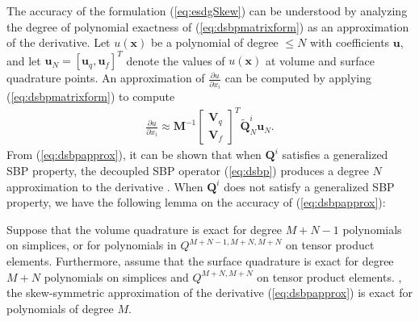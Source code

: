 \documentclass{svjour3}                     %
\renewcommand{\tilde}{\widetilde}
\newcommand{\pd}[2]{\frac{\partial#1}{\partial#2}}
\newcommand{\LRp}[1]{\left( #1 \right)}
\newcommand{\LRs}[1]{\left[ #1 \right]}
\newcommand{\bnote}[1]{{\color{blue}{#1}}}
\begin{document}
The accuracy of the formulation (\ref{eq:esdgSkew}) can be understood by analyzing the degree of polynomial exactness of (\ref{eq:dsbpmatrixform}) as an approximation of the derivative.  Let $u(\bm{x})$ be a polynomial of degree $\leq N$ with coefficients $\bm{u}$, and let $\bm{u}_N = \LRs{\bm{u}_q, \bm{u}_f}^T$ denote the values of $u(\bm{x})$ at volume and surface quadrature points.  An approximation of $\pd{u}{x_i}$ can be computed by applying (\ref{eq:dsbpmatrixform}) to compute
\begin{align}
\pd{u}{x_i}\approx 
\bm{M}^{-1}\LRs{\begin{array}{c}
\bm{V}_q \\ \bm{V}_f\end{array}}^T \tilde{\bm{Q}}^i_N\bm{u}_N.
\label{eq:dsbpapprox}
\end{align}
From (\ref{eq:dsbpapprox}), it can be shown that when $\bm{Q}^i$ satisfies a generalized SBP property, the decoupled SBP operator (\ref{eq:dsbp}) produces a degree $N$ approximation to the derivative \cite{chan2017discretely}.  When $\bm{Q}^i$ does not satisfy a generalized SBP property, we have the following lemma on the accuracy of (\ref{eq:dsbpapprox}):
\begin{lemma}
Suppose that the volume quadrature is exact for degree $M+N-1$ polynomials on simplices, or for polynomials in $Q^{M+N-1,M+N,M+N}$ on tensor product elements.  Furthermore, assume that the surface quadrature is exact for degree $M+N$ polynomials on simplices and $Q^{M+N,M+N}$ on tensor product elements.  \bnote{Then, so long as the mass matrix is positive definite}, the skew-symmetric approximation of the derivative (\ref{eq:dsbpapprox}) is exact for polynomials of degree $M$.  
\label{lemma:dsbpapprox}
\end{lemma}
\end{document}
